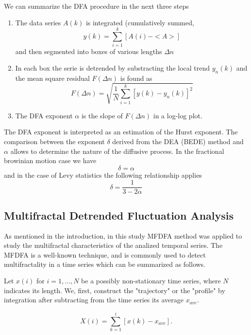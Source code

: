 \documentclass[onecolumn, preprint,aps,amsmath, amssymb, superscriptaddress]{revtex4}
\begin{document}
We can summarize the DFA procedure in the next three steps

\begin{enumerate}
\item The data series $A(k)$ is integrated (cumulatively summed, 
\begin{equation}
y(k) = \sum_{i=1}^{k}[A(i)-<A>]
\end{equation} and then segmented into boxes of various lengths $\Delta n$
\item In each box the serie is detrended by substracting the local trend $y_n(k)$ and the mean square residual $F(\Delta n)$ is found as
\begin{equation}
F(\Delta n) = \sqrt{\dfrac{1}{N}\displaystyle\sum_{i=1}^{k}[y(k)-y_n(k)]^2}
\end{equation} 
\item The DFA exponent $\alpha$ is the slope of $F(\Delta n)$ in a log-log plot.
\end{enumerate}
The DFA exponent is interpreted as an estimation of the Hurst exponent.
The comparison between the exponent $\delta$ derived from the DEA (BEDE) method and $\alpha$ allows to determine the nature of the diffusive process. In the fractional browinian motion case we have
\begin{equation}
\delta = \alpha 
\end{equation}
and in the case of Levy statistics the following relationship applies
\begin{equation}
\delta = \dfrac{1}{3-2\alpha}
\label{eq:levy}
\end{equation}

\subsection{Multifractal Detrended Fluctuation Analysis}

As mentioned in the introduction, in this study MFDFA method was applied to study the multifractal characteristics of the analized temporal series. The MFDFA is a well-known technique, and is commonly used to detect multifractality in a time series \cite{Kantelhardt} which can be summarized as follows.

Let $x(i)$ for $i=1,\ldots,N$ be a possibly non-stationary time series, where $N$ indicates its length. We, first, construct the "trajectory" or the "profile" by integration after subtracting from the time series its average $x_{ave}$.

\begin{equation}
X(i)=\sum_{k=1}^i[x(k)-x_{ave}].
\label{eq:signal}
\end{equation}
\end{document}
